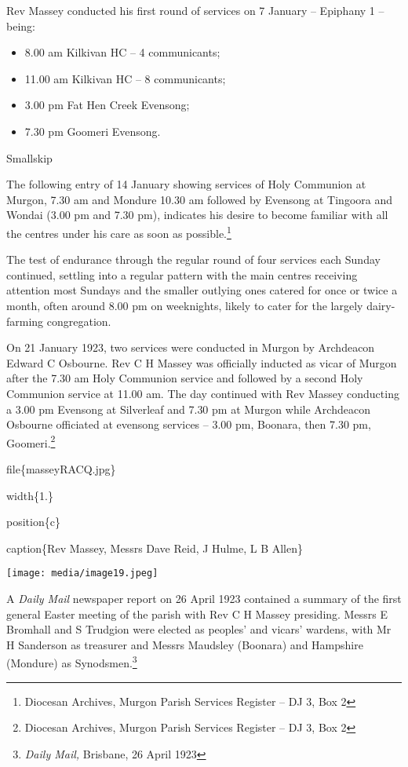 Rev Massey conducted his first round of services on 7 January -- Epiphany 1 -- being:

\begin{itemize}
\item
  8.00 am Kilkivan HC -- 4 communicants;
\item
  11.00 am Kilkivan HC -- 8 communicants;
\item
  3.00 pm Fat Hen Creek Evensong;
\item
  7.30 pm Goomeri Evensong.
\end{itemize}

Smallskip

The following entry of 14 January showing services of Holy Communion at Murgon, 7.30 am and Mondure 10.30 am followed by Evensong at Tingoora and Wondai (3.00 pm and 7.30 pm), indicates his desire to become familiar with all the centres under his care as soon as possible.\footnote{Diocesan Archives, Murgon Parish Services Register -- DJ 3, Box 2}

The test of endurance through the regular round of four services each Sunday continued, settling into a regular pattern with the main centres receiving attention most Sundays and the smaller outlying ones catered for once or twice a month, often around 8.00 pm on weeknights, likely to cater for the largely dairy-farming congregation.

On 21 January 1923, two services were conducted in Murgon by Archdeacon Edward C Osbourne. Rev C H Massey was officially inducted as vicar of Murgon after the 7.30 am Holy Communion service and followed by a second Holy Communion service at 11.00 am. The day continued with Rev Massey conducting a 3.00 pm Evensong at Silverleaf and 7.30 pm at Murgon while Archdeacon Osbourne officiated at evensong services -- 3.00 pm, Boonara, then 7.30 pm, Goomeri.\footnote{Diocesan Archives, Murgon Parish Services Register -- DJ 3, Box 2}

file\{masseyRACQ.jpg\}

width\{1.\}

position\{c\}

caption\{Rev Massey, Messrs Dave Reid, J Hulme, L B Allen\}

\texttt{[image: media/image19.jpeg]}

A \emph{Daily Mail} newspaper report on 26 April 1923 contained a summary of the first general Easter meeting of the parish with Rev C H Massey presiding. Messrs E Bromhall and S Trudgion were elected as peoples' and vicars' wardens, with Mr H Sanderson as treasurer and Messrs Maudsley (Boonara) and Hampshire (Mondure) as Synodsmen.\footnote{\emph{Daily Mail,} Brisbane, 26 April 1923}

